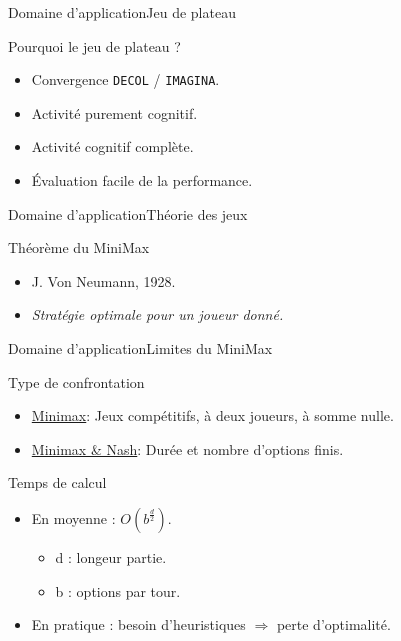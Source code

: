 \begin{frame}{Domaine d'application}{Jeu de plateau}

\begin{block}{Pourquoi le jeu de plateau ?}
\begin{itemize}
\item Convergence \texttt{DECOL} / \texttt{IMAGINA}.
\pause
\item Activité purement cognitif.
\pause
\item Activité cognitif complète.
\pause
\item Évaluation facile de la performance.
\end{itemize}
\end{block}

\end{frame}


\begin{frame}{Domaine d'application}{Théorie des jeux}

\begin{block}{Théorème du MiniMax}
\begin{itemize}
\item J. Von Neumann, 1928.
\item \textit{Stratégie optimale pour un joueur donné.}
\end{itemize}
\end{block}
\end{frame}



\begin{frame}{Domaine d'application}{Limites du MiniMax}

\begin{block}{Type de confrontation}
\begin{itemize}
\item \underline{Minimax}: Jeux compétitifs, à deux joueurs, à somme nulle.
\item \underline{Minimax \& Nash}: Durée et nombre d'options finis.
\end{itemize}
\end{block}

\pause

\begin{block}{Temps de calcul}
\begin{itemize}
\item En moyenne : \emph{$O(b^{\frac{d}{2}})$}.
	\begin{itemize}
	\item d : longeur partie.
	\item b : options par tour.
	\end{itemize}
\item En pratique : besoin d'heuristiques $\Rightarrow$ perte d'optimalité.
\end{itemize}
\end{block}

\end{frame}